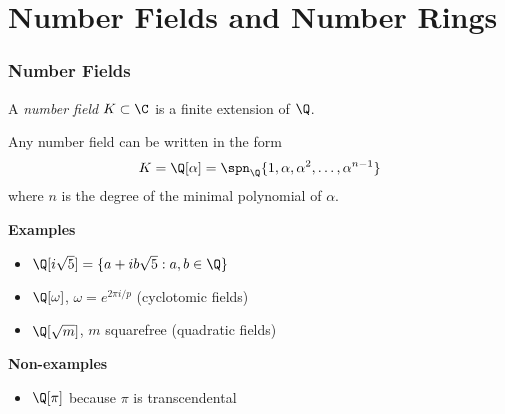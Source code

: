 \section{Number Fields and Number Rings}


\begin{frame}
	\frametitle{Number Fields}

	\begin{definition}
		A \emph{number field} $K \subset \C$ is a finite extension of $\Q$.
	\end{definition}

	\pause

	\begin{theorem}
		Any number field can be written in the form
		\begin{equation*}
			K
			= \Q[\alpha]
			= \spn_\Q \{ 1, \alpha, \alpha^2, \ldots, \alpha^{n-1} \}
		\end{equation*}
		where $n$ is the degree of the minimal polynomial of $\alpha$.
	\end{theorem}

	\pause

	\textbf{Examples}

	\begin{itemize}[<+->]
		\item $\Q[i \sqrt 5] = \{ a + i b \sqrt 5 : a, b \in \Q \}$
		\item $\Q[\omega]$, $\omega = e^{2 \pi i / p}$ (cyclotomic fields)
		\item $\Q[\sqrt m]$, $m$ squarefree (quadratic fields)
	\end{itemize}

	\pause

	\textbf{Non-examples}

	\begin{itemize}
		\item $\Q[\pi]$ because $\pi$ is transcendental
	\end{itemize}
\end{frame}

